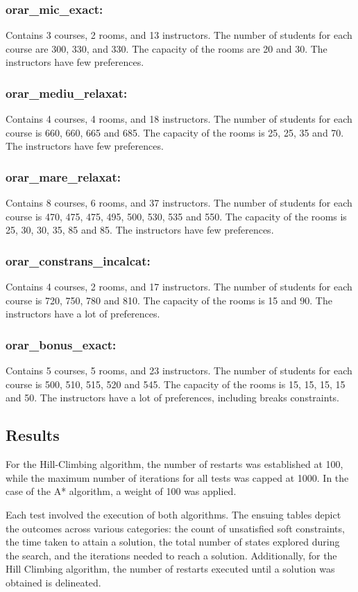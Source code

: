 \documentclass[runningheads]{paper}
\begin{document}
\subsubsection{orar\_mic\_exact:} Contains 3 courses, 2 rooms, and 13 instructors. The
number of students for each course are 300, 330, and 330. The capacity of the rooms are
20 and 30. The instructors have few preferences.
\subsubsection{orar\_mediu\_relaxat:} Contains 4 courses, 4 rooms, and 18 instructors. The
number of students for each course is 660, 660, 665 and 685. The capacity of the rooms is
25, 25, 35 and 70. The instructors have few preferences.
\subsubsection{orar\_mare\_relaxat:} Contains 8 courses, 6 rooms, and 37 instructors. The
number of students for each course is 470, 475, 475, 495, 500, 530, 535 and 550. The capacity of the rooms is
25, 30, 30, 35, 85 and 85. The instructors have few preferences.
\subsubsection{orar\_constrans\_incalcat:} Contains 4 courses, 2 rooms, and 17 instructors. The
number of students for each course is 720, 750, 780 and 810. The capacity of the rooms is
15 and 90. The instructors have a lot of preferences.
\subsubsection{orar\_bonus\_exact:} Contains 5 courses, 5 rooms, and 23 instructors. The
number of students for each course is 500, 510, 515, 520 and 545. The capacity of the rooms is
15, 15, 15, 15 and 50. The instructors have a lot of preferences, including breaks constraints.

\subsection{Results}
For the Hill-Climbing algorithm, the number of restarts was established at 100,
while the maximum number of iterations for all tests was capped at 1000. In the 
case of the A* algorithm, a weight of 100 was applied.

Each test involved the execution of both algorithms. The ensuing tables depict 
the outcomes across various categories: the count of unsatisfied soft 
constraints, the time taken to attain a solution, the total number of states 
explored during the search, and the iterations needed to reach a solution. 
Additionally, for the Hill Climbing algorithm, the number of restarts executed 
until a solution was obtained is delineated.
\end{document}
